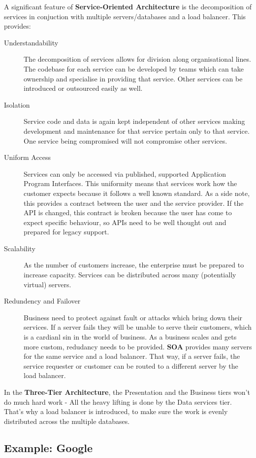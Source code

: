 \documentclass[11pt]{article}
\begin{document}
A significant feature of \textbf{Service-Oriented Architecture} is the decomposition of services in conjuction with multiple servers/databases and a load balancer. This provides:
\begin{description}
  \item[Understandability]
  The decomposition of services allows for division along organisational lines. The codebase for each service can be developed by teams which can take ownership and specialise in providing that service. Other services can be introduced or outsourced easily as well.
  \item[Isolation]
  Service code and data is again kept independent of other services making development and maintenance for that service pertain only to that service. One service being compromised will not compromise other services.
  \item[Uniform Access]
  Services can only be accessed via published, supported Application Program Interfaces. This uniformity means that services work how the customer expects because it follows a well known standard. As a side note, this provides a contract between the user and the service provider. If the API is changed, this contract is broken because the user has come to expect specific behaviour, so APIs need to be well thought out and prepared for legacy support.
  \item[Scalability]
  As the number of customers increase, the enterprise must be prepared to increase capacity. Services can be distributed across many (potentially virtual) servers.
  \item[Redundency and Failover]
  Business need to protect against fault or attacks which bring down their services. If a server fails they will be unable to serve their customers, which is a cardianl sin in the world of business. As a business scales and gets more custom, redudancy needs to be provided. \textbf{SOA} provides many servers for the same service and a load balancer. That way, if a server fails, the service requester or customer can be routed to a different server by the load balancer.
\end{description}

In the \textbf{Three-Tier Architecture}, the Presentation and the Business tiers won’t do much hard work - All the heavy lifting is done by the Data services tier. That’s why a load balancer is introduced, to make sure the work is evenly distributed across the multiple databases.

\subsection{Example: Google}
\end{document}
